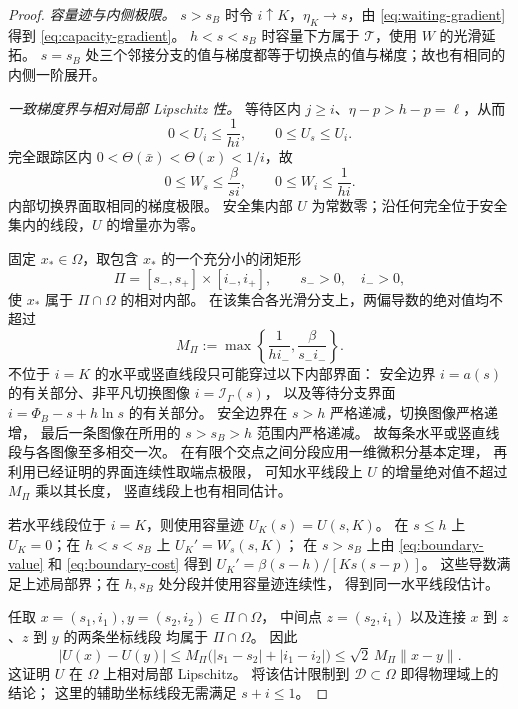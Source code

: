 \documentclass[11pt,a4paper,UTF8]{ctexart}
\theoremstyle{definition}
\newcommand{\Dcal}{\mathcal D}
\begin{document}
\begin{proof}
\emph{容量迹与内侧极限。}
$s>s_B$ 时令 $i\uparrow K$，$\eta_K\to s$，由 \eqref{eq:waiting-gradient} 得到 \eqref{eq:capacity-gradient}。
$h<s<s_B$ 时容量下方属于 $\mathcal T$，使用 $W$ 的光滑延拓。
$s=s_B$ 处三个邻接分支的值与梯度都等于切换点的值与梯度；故也有相同的内侧一阶展开。

\emph{一致梯度界与相对局部 Lipschitz 性。}
等待区内 $j\ge i$、$\eta-p>h-p=\ell$，从而
\[
0<U_i\le\frac{1}{hi},\qquad 0\le U_s\le U_i.
\]
完全跟踪区内 $0<\Theta(\bar x)<\Theta(x)<1/i$，故
\[
0\le W_s\le\frac{\beta}{si},\qquad 0\le W_i\le\frac{1}{hi}.
\]
内部切换界面取相同的梯度极限。
安全集内部 $U$ 为常数零；沿任何完全位于安全集内的线段，$U$ 的增量亦为零。

固定 $x_*\in\Omega$，取包含 $x_*$ 的一个充分小的闭矩形
\[
\Pi=[s_-,s_+]\times[i_-,i_+],\qquad s_->0,\quad i_->0,
\]
使 $x_*$ 属于 $\Pi\cap\Omega$ 的相对内部。
在该集合各光滑分支上，两偏导数的绝对值均不超过
\[
M_\Pi:=\max\left\{\frac{1}{hi_-},\frac{\beta}{s_-i_-}\right\}.
\]
不位于 $i=K$ 的水平或竖直线段只可能穿过以下内部界面：
安全边界 $i=a(s)$ 的有关部分、非平凡切换图像 $i=\mathcal I_\Gamma(s)$，
以及等待分支界面 $i=\Phi_B-s+h\ln s$ 的有关部分。
安全边界在 $s>h$ 严格递减，切换图像严格递增，
最后一条图像在所用的 $s>s_B>h$ 范围内严格递减。
故每条水平或竖直线段与各图像至多相交一次。
在有限个交点之间分段应用一维微积分基本定理，
再利用已经证明的界面连续性取端点极限，
可知水平线段上 $U$ 的增量绝对值不超过 $M_\Pi$ 乘以其长度，
竖直线段上也有相同估计。

若水平线段位于 $i=K$，则使用容量迹 $U_K(s)=U(s,K)$。
在 $s\le h$ 上 $U_K=0$；在 $h<s<s_B$ 上 $U_K'=W_s(s,K)$；
在 $s>s_B$ 上由 \eqref{eq:boundary-value} 和 \eqref{eq:boundary-cost}
得到 $U_K'=\beta(s-h)/[Ks(s-p)]$。
这些导数满足上述局部界；在 $h,s_B$ 处分段并使用容量迹连续性，
得到同一水平线段估计。

任取 $x=(s_1,i_1),y=(s_2,i_2)\in \Pi\cap\Omega$，
中间点 $z=(s_2,i_1)$ 以及连接 $x$ 到 $z$、$z$ 到 $y$ 的两条坐标线段
均属于 $\Pi\cap\Omega$。
因此
\[
|U(x)-U(y)|
\le M_\Pi\bigl(|s_1-s_2|+|i_1-i_2|\bigr)
\le\sqrt{2}\,M_\Pi\lVert x-y\rVert.
\]
这证明 $U$ 在 $\Omega$ 上相对局部 Lipschitz。
将该估计限制到 $\Dcal\subset\Omega$ 即得物理域上的结论；
这里的辅助坐标线段无需满足 $s+i\le1$。

\end{proof}
\end{document}

